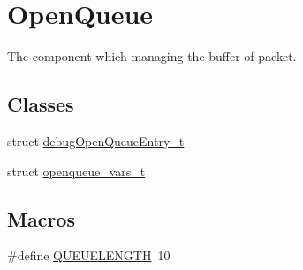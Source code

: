\hypertarget{group___open_queue}{}\section{Open\+Queue}
\label{group___open_queue}


The component which managing the buffer of packet.  


\subsection*{Classes}
\begin{DoxyCompactItemize}
\item 
struct \hyperlink{structdebug_open_queue_entry__t}{debug\+Open\+Queue\+Entry\+\_\+t}
\item 
struct \hyperlink{structopenqueue__vars__t}{openqueue\+\_\+vars\+\_\+t}
\end{DoxyCompactItemize}
\subsection*{Macros}
\begin{DoxyCompactItemize}
\item 
\#define \hyperlink{group___open_queue_gaf56b9dc58ae650ca79c068105b84bb79}{Q\+U\+E\+U\+E\+L\+E\+N\+G\+TH}~10
\end{DoxyCompactItemize}
